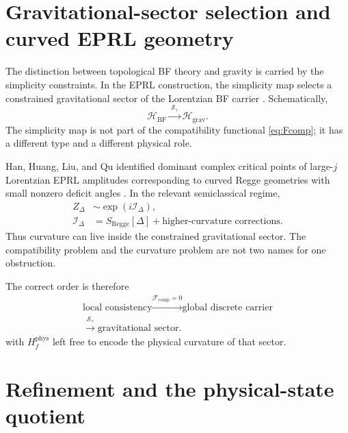 \documentclass[aps,prd,reprint,nofootinbib,superscriptaddress]{revtex4-2}
\newcommand{\phys}{\mathrm{phys}}
\begin{document}
\section{Gravitational-sector selection and curved EPRL geometry}

The distinction between topological BF theory and gravity is carried by the simplicity constraints. In the EPRL construction, the simplicity map selects a constrained gravitational sector of the Lorentzian BF carrier \cite{EnglePereiraRovelli2007,Perez2013}. Schematically,
\begin{equation}
\mathcal H_{\mathrm{BF}}
\xrightarrow{\ \mathcal S_\gamma\ }
\mathcal H_{\mathrm{grav}}.
\label{eq:simplicity}
\end{equation}
The simplicity map is not part of the compatibility functional \eqref{eq:Fcomp}; it has a different type and a different physical role.

Han, Huang, Liu, and Qu identified dominant complex critical points of large-$j$ Lorentzian EPRL amplitudes corresponding to curved Regge geometries with small nonzero deficit angles \cite{HanEtAl2022}. In the relevant semiclassical regime,
\begin{equation}
\begin{aligned}
Z_\Delta&\sim\exp\!\left(i\mathcal I_\Delta\right),\\
\mathcal I_\Delta&=S_{\mathrm{Regge}}[\Delta]
+\text{higher-curvature corrections}.
\end{aligned}
\label{eq:curvedEPRL}
\end{equation}
Thus curvature can live inside the constrained gravitational sector. The compatibility problem and the curvature problem are not two names for one obstruction.

The correct order is therefore
\begin{equation}
\boxed{
\begin{gathered}
\text{local consistency}
\xrightarrow{\mathcal F_{\mathrm{comp}}=0}
\text{global discrete carrier}\\[-0.5mm]
\xrightarrow{\mathcal S_\gamma}
\text{gravitational sector}.
\end{gathered}
}
\label{eq:order}
\end{equation}
with $H_f^{\phys}$ left free to encode the physical curvature of that sector.

\section{Refinement and the physical-state quotient}
\label{sec:refinement}
\end{document}

